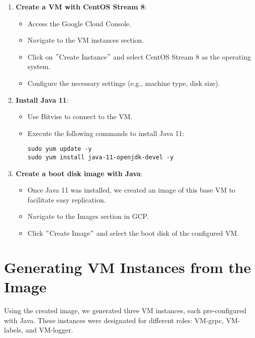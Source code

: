 \begin{enumerate}
    \item \textbf{Create a VM with CentOS Stream 8}:
    \begin{itemize}
        \item Access the Google Cloud Console.
        \item Navigate to the VM instances section.
        \item Click on \("\)Create Instance\("\) and select CentOS Stream 8 as the operating system.
        \item Configure the necessary settings (e.g., machine type, disk size).
    \end{itemize}

    \item \textbf{Install Java 11}:
    \begin{itemize}
        \item Use Bitvise to connect to the VM.
        \item Execute the following commands to install Java 11:
        \begin{verbatim}
sudo yum update -y
sudo yum install java-11-openjdk-devel -y
        \end{verbatim}
    \end{itemize}

    \item \textbf{Create a boot disk image with Java}:
    \begin{itemize}
        \item Once Java 11 was installed, we created an image of this base VM to facilitate easy replication.
        \item Navigate to the Images section in GCP.
        \item Click \("\)Create Image\("\) and select the boot disk of the configured VM.
    \end{itemize}
\end{enumerate}


\section{Generating VM Instances from the Image}\label{sec:generating-vm-instances-from-the-image}

Using the created image, we generated three VM instances, each pre-configured with Java. These instances were designated for different roles: VM-grpc, VM-labels, and VM-logger.

